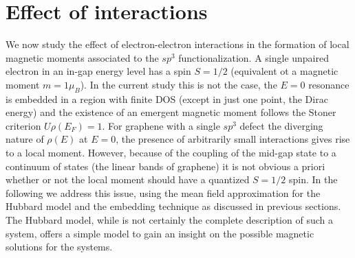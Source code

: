\documentclass[aps,prb,twocolumn,superscriptaddress]{revtex4-1}
\begin{document}
\section{Effect of interactions}
\label{sec:MF}
We now study the effect of electron-electron interactions in the formation of local magnetic moments associated to the $sp^3$ functionalization. A single unpaired electron in an in-gap energy level has a spin $S=1/2$ (equivalent ot a magnetic moment $m=1\mu_B$). In the current study this is not the case, the $E=0$ resonance is embedded in a region with finite DOS (except in just one point, the Dirac energy) and the existence of an emergent magnetic moment follows the Stoner criterion $U\rho(E_F)=1$. For graphene with a single $sp^3$ defect the diverging nature of $\rho(E)$ at $E=0$, the presence of arbitrarily small interactions gives rise to a local moment.
However, because of the coupling of the mid-gap state to a continuum of states (the linear bands of graphene) it is not obvious a priori whether or not the local moment should have a quantized $S=1/2$ spin.
In the following we address this issue, using the mean field approximation for the Hubbard model and the embedding technique as discussed in previous sections. The Hubbard model, while is not certainly the complete description of such a system, offers a simple model to gain an insight on the possible magnetic solutions for the systems.
\end{document}
